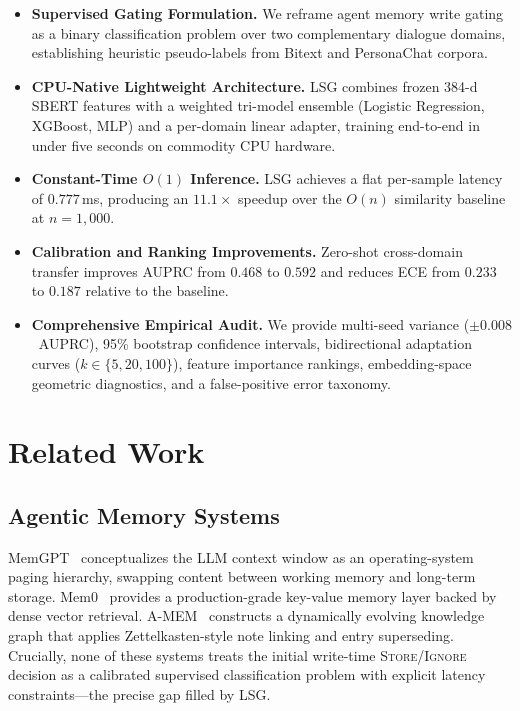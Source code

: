 \documentclass[conference]{IEEEtran}
\begin{document}
\begin{itemize}
  \item \textbf{Supervised Gating Formulation.}
    We reframe agent memory write gating as a binary
    classification problem over two complementary dialogue
    domains, establishing heuristic pseudo-labels from
    Bitext and PersonaChat corpora.

  \item \textbf{CPU-Native Lightweight Architecture.}
    LSG combines frozen 384-d SBERT features with a
    weighted tri-model ensemble (Logistic Regression,
    XGBoost, MLP) and a per-domain linear adapter,
    training end-to-end in under five seconds on commodity
    CPU hardware.

  \item \textbf{Constant-Time $O(1)$ Inference.}
    LSG achieves a flat per-sample latency of
    $0.777$\,ms, producing an $11.1{\times}$ speedup
    over the $O(n)$ similarity baseline at
    $n{=}1{,}000$.

  \item \textbf{Calibration and Ranking Improvements.}
    Zero-shot cross-domain transfer improves AUPRC from
    $0.468$ to $0.592$ and reduces ECE from $0.233$ to
    $0.187$ relative to the baseline.

  \item \textbf{Comprehensive Empirical Audit.}
    We provide multi-seed variance ($\pm 0.008$~AUPRC),
    95\% bootstrap confidence intervals, bidirectional
    adaptation curves ($k\in\{5,20,100\}$), feature
    importance rankings, embedding-space geometric
    diagnostics, and a false-positive error taxonomy.
\end{itemize}

\section{Related Work}

\subsection{Agentic Memory Systems}
MemGPT~\cite{packer2023memgpt} conceptualizes the LLM context
window as an operating-system paging hierarchy, swapping
content between working memory and long-term storage.
Mem0~\cite{mem0_2025} provides a production-grade key-value
memory layer backed by dense vector retrieval.
A-MEM~\cite{xu2025amem} constructs a dynamically evolving
knowledge graph that applies Zettelkasten-style note linking
and entry superseding.
Crucially, none of these systems treats the initial
write-time \textsc{Store}/\textsc{Ignore} decision as a
calibrated supervised classification problem with explicit
latency constraints---the precise gap filled by LSG.
\end{document}
